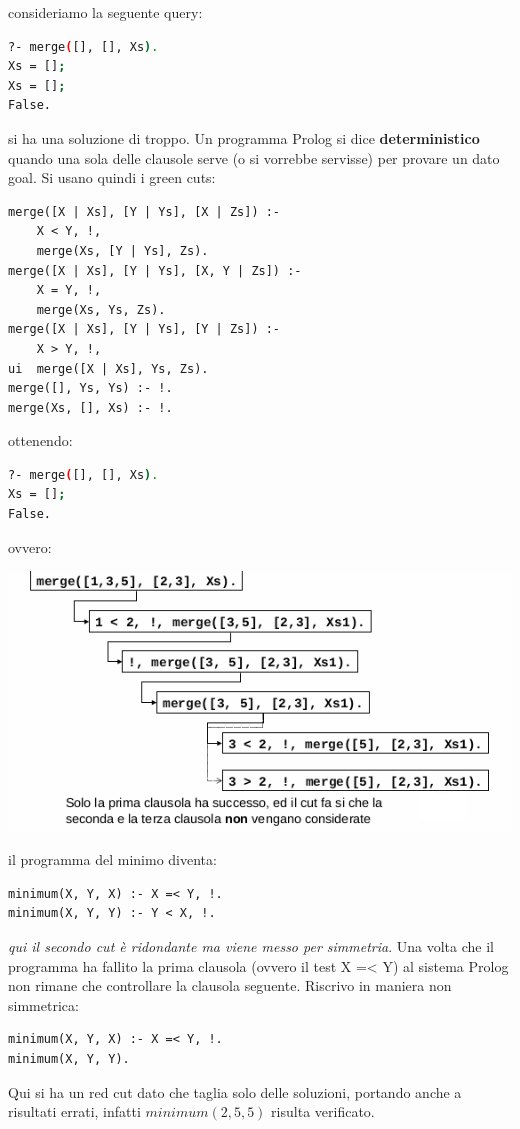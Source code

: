 \documentclass[a4paper]{report}
\begin{document}
consideriamo la seguente query:
\begin{shaded}
\begin{lstlisting}[language=bash]
?- merge([], [], Xs).
Xs = [];
Xs = [];
False.
\end{lstlisting}
\end{shaded}
si ha una soluzione di troppo.
Un programma Prolog si dice \textbf{deterministico} quando una sola delle clausole serve (o si vorrebbe servisse) per provare un dato goal. Si usano quindi i green cuts:
\begin{verbatim}
merge([X | Xs], [Y | Ys], [X | Zs]) :-
	X < Y, !,
	merge(Xs, [Y | Ys], Zs).
merge([X | Xs], [Y | Ys], [X, Y | Zs]) :-
	X = Y, !,
	merge(Xs, Ys, Zs).
merge([X | Xs], [Y | Ys], [Y | Zs]) :-
	X > Y, !,
ui	merge([X | Xs], Ys, Zs).
merge([], Ys, Ys) :- !.
merge(Xs, [], Xs) :- !.
\end{verbatim}
ottenendo:
\begin{shaded}
\begin{lstlisting}[language=bash]
?- merge([], [], Xs).
Xs = [];
False.
\end{lstlisting}
\end{shaded}
ovvero:
\begin{center}
\includegraphics[scale=0.8]{img/cut3.png}
\end{center}
il programma del minimo diventa:
\begin{verbatim}
minimum(X, Y, X) :- X =< Y, !.
minimum(X, Y, Y) :- Y < X, !.
\end{verbatim}
\textit{qui il secondo cut è ridondante ma viene messo per simmetria}.\newline
Una volta che il programma ha fallito la prima clausola (ovvero il test X =< Y) al sistema Prolog non rimane che controllare la
clausola seguente.\newline
Riscrivo in maniera non simmetrica:
\begin{verbatim}
minimum(X, Y, X) :- X =< Y, !.
minimum(X, Y, Y).
\end{verbatim}
Qui si ha un red cut dato che taglia solo delle soluzioni, portando anche a risultati errati, infatti $minimum(2, 5, 5)$ risulta verificato.
\end{document}
